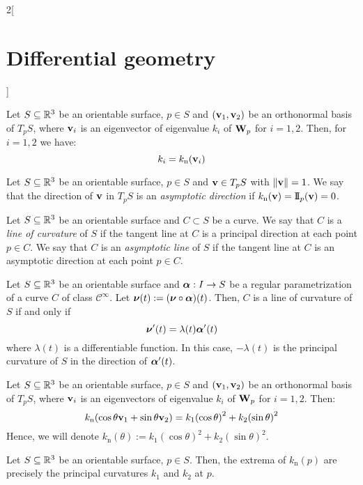 \documentclass[../../../main_math.tex]{subfiles}
\begin{document}
\begin{multicols}{2}[\section{Differential geometry}]
\begin{definition}
  \end{definition}
  \begin{proposition}
    Let $S\subseteq\mathbb{R}^3$ be an orientable surface, $p\in S$ and $(\boldsymbol{\mathrm{v}}_1,\boldsymbol{\mathrm{v}}_2)$ be an orthonormal basis of $T_pS$, where $\boldsymbol{\mathrm{v}}_i$ is an eigenvector of eigenvalue $k_i$ of $\boldsymbol{\mathrm{W}}_p$ for $i=1,2$. Then, for $i=1,2$ we have: $$k_i=k_\text{n}(\boldsymbol{\mathrm{v}}_i)$$
  \end{proposition}
  \begin{definition}
    Let $S\subseteq\mathbb{R}^3$ be an orientable surface, $p\in S$ and $\boldsymbol{\mathrm{v}}\in T_pS$ with $\|\boldsymbol{\mathrm{v}}\|=1$. We say that the direction of $\boldsymbol{\mathrm{v}}$ in $T_pS$ is an \emph{asymptotic direction} if $k_\text{n}(\boldsymbol{\mathrm{v}})=\mathrm{I\!I}_p(\boldsymbol{\mathrm{v}})=0$.
  \end{definition}
  \begin{definition}
    Let $S\subseteq\mathbb{R}^3$ be an orientable surface and $C\subset S$ be a curve. We say that $C$ is a \emph{line of curvature} of $S$ if the tangent line at $C$ is a principal direction at each point $p\in C$. We say that $C$ is an \emph{asymptotic line} of $S$ if the tangent line at $C$ is an asymptotic direction at each point $p\in C$.
  \end{definition}
  \begin{proposition}
    Let $S\subseteq\mathbb{R}^3$ be an orientable surface and $\boldsymbol{\mathrm{\alpha}}:I\rightarrow S$ be a regular parametrization of a curve $C$ of class $\mathcal{C}^\infty$. Let $\boldsymbol{\mathrm{\nu}}(t):=(\boldsymbol{\mathrm{\nu}}\circ\boldsymbol{\mathrm{\alpha}})(t)$. Then, $C$ is a line of curvature of $S$ if and only if $$\boldsymbol{\mathrm{\nu}}'(t)=\lambda(t)\boldsymbol{\mathrm{\alpha}}'(t)$$ where $\lambda(t)$ is a differentiable function. In this case, $-\lambda(t)$ is the principal curvature of $S$ in the direction of $\boldsymbol{\mathrm{\alpha}}'(t)$.
  \end{proposition}
  \begin{proposition}
    Let $S\subseteq\mathbb{R}^3$ be an orientable surface, $p\in S$ and $(\boldsymbol{\mathrm{v}}_1,\boldsymbol{\mathrm{v}}_2)$ be an orthonormal basis of $T_pS$, where $\boldsymbol{\mathrm{v}}_i$ is an eigenvectors of eigenvalue $k_i$ of $\boldsymbol{\mathrm{W}}_p$ for $i=1,2$. Then: $$k_\text{n}(\cos\theta \boldsymbol{\mathrm{v}}_1+\sin\theta \boldsymbol{\mathrm{v}}_2)=k_1{\left(\cos\theta\right)}^2+k_2{\left(\sin\theta\right)}^2$$
    Hence, we will denote $k_\text{n}(\theta):=k_1{\left(\cos\theta\right)}^2+k_2{\left(\sin\theta\right)}^2$.
  \end{proposition}
  \begin{corollary}
    Let $S\subseteq\mathbb{R}^3$ be an orientable surface, $p\in S$. Then, the extrema of $k_\text{n}(p)$ are precisely the principal curvatures $k_1$ and $k_2$ at $p$.

\end{corollary}
\end{multicols}
\end{document}
